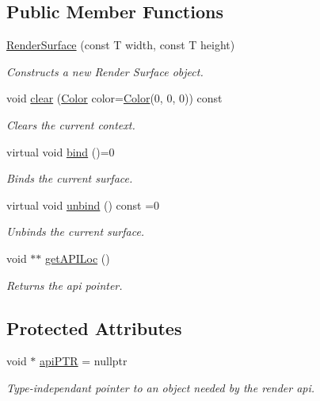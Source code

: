 \subsection*{Public Member Functions}
\begin{DoxyCompactItemize}
\item 
\hyperlink{classpcs_1_1rend_1_1RenderSurface_a908ee596a69b977a74270f03ecc90808}{Render\+Surface} (const T width, const T height)
\begin{DoxyCompactList}\small\item\em Constructs a new Render Surface object. \end{DoxyCompactList}\item 
void \hyperlink{classpcs_1_1rend_1_1RenderSurface_ac875e478b7cbf438aa541f31fba6b750}{clear} (\hyperlink{structpcs_1_1Color}{Color} color=\hyperlink{structpcs_1_1Color}{Color}(0, 0, 0)) const
\begin{DoxyCompactList}\small\item\em Clears the current context. \end{DoxyCompactList}\item 
virtual void \hyperlink{classpcs_1_1rend_1_1RenderSurface_a79c0b291ed5a7b901fe4233bf8b376f2}{bind} ()=0
\begin{DoxyCompactList}\small\item\em Binds the current surface. \end{DoxyCompactList}\item 
virtual void \hyperlink{classpcs_1_1rend_1_1RenderSurface_aacb7218feb1973ee4b0486494fcd8c88}{unbind} () const =0
\begin{DoxyCompactList}\small\item\em Unbinds the current surface. \end{DoxyCompactList}\item 
void $\ast$$\ast$ \hyperlink{classpcs_1_1rend_1_1RenderSurface_a54cbf8c34638a82bfe02bc1f1663a4ab}{get\+A\+P\+I\+Loc} ()
\begin{DoxyCompactList}\small\item\em Returns the api pointer. \end{DoxyCompactList}\end{DoxyCompactItemize}
\subsection*{Protected Attributes}
\begin{DoxyCompactItemize}
\item 
void $\ast$ \hyperlink{classpcs_1_1rend_1_1RenderSurface_ac991c5aaed973108fa4bb97d605f02cc}{api\+P\+TR} = nullptr
\begin{DoxyCompactList}\small\item\em Type-\/independant pointer to an object needed by the render api. \end{DoxyCompactList}\end{DoxyCompactItemize}
